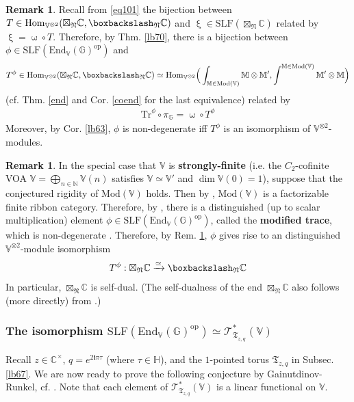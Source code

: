 \documentclass[11pt,b5paper,notitlepage]{article}
\theoremstyle{definition}
\newtheorem{rem}[df]{Remark}
\theoremstyle{plain}
\newcommand{\Tr}{\mathrm{Tr}}
\newcommand{\End}{\mathrm{End}} %
\newcommand{\Hom}{\mathrm{Hom}}
\newcommand{\opp}{\mathrm{op}}
\newcommand{\im}{\mathbf{i}}
\newcommand{\SLF}{\mathrm{SLF}}
\newcommand{\mbb}{\mathbb}
\newcommand{\Vbb}{\mathbb V}
\newcommand{\Mbb}{\mathbb M}
\newcommand{\Gbb}{\mathbb G}
\newcommand{\Cbb}{\mathbb C}
\newcommand{\Nbb}{\mathbb N}
\newcommand{\<}{\left\langle}
\renewcommand{\>}{\right\rangle}
\newcommand{\ST}{\mathscr{T}}
\newcommand{\bbs}{\boxbackslash}
\newcommand{\ft}{{\mathfrak T}}
\newcommand{\Mod}{\mathrm{Mod}}
\newcommand{\fn}{\mathfrak{N}}
\numberwithin{equation}{section}
\begin{document}
\begin{rem}\label{lb73}
Recall from \eqref{eq101} the bijection between $T\in\Hom_{\Vbb^{\otimes 2}}(\boxtimes_\fn\Cbb,\bbs_\fn\Cbb)$ and $\upxi\in\SLF(\boxtimes_\fn\Cbb)$ related by $\upxi=\upomega\circ T$. Therefore, by Thm. \ref{lb70}, there is a bijection between  $\phi\in\SLF(\End_\Vbb(\Gbb)^\opp)$ and
\begin{align*}
T^\phi\in\Hom_{\Vbb^{\otimes2}}(\boxtimes_\fn\Cbb,\bbs_\fn\Cbb)\simeq \Hom_{\Vbb^{\otimes2}}\Big(\int_{\Mbb\in\Mod(\Vbb)}\Mbb\otimes\Mbb',\int^{\Mbb\in\Mod(\Vbb)}\Mbb'\otimes\Mbb\Big)
\end{align*}
(cf. Thm. \ref{end} and Cor. \ref{coend} for the last equivalence) related by
\begin{align}
\Tr^\phi\circ\pi_\Gbb=\upomega\circ T^\phi
\end{align}
Moreover, by Cor. \ref{lb63}, $\phi$ is non-degenerate iff $T^\phi$ is an isomorphism of $\Vbb^{\otimes 2}$-modules.
\end{rem}

\begin{rem}\label{lb74}
In the special case that $\Vbb$ is \textbf{strongly-finite} (i.e. the $C_2$-cofinite VOA $\Vbb=\bigoplus_{n\in\Nbb}\Vbb(n)$ satisfies $\Vbb\simeq\Vbb'$ and $\dim\Vbb(0)=1$), suppose that the conjectured rigidity of $\Mod(\Vbb)$ holds. Then by \cite{McR21-rational}, $\Mod(\Vbb)$ is a factorizable finite ribbon category. Therefore, by \cite{GR-modified-trace}, there is a distinguished (up to scalar multiplication) element $\phi\in\SLF(\End_\Vbb(\Gbb)^\opp)$, called the \textbf{modified trace}, which is non-degenerate \cite[Prop. 4.2]{GR-modified-trace}. Therefore, by Rem. \ref{lb73}, $\phi$ gives rise to an distinguished $\Vbb^{\otimes 2}$-module isomorphism
\begin{align*}
T^\phi:\boxtimes_\fn\Cbb\xrightarrow{\simeq}\bbs_\fn\Cbb
\end{align*}
In particular, $\boxtimes_\fn\Cbb$ is self-dual. (The self-dualness of the end $\boxtimes_\fn\Cbb$ also follows (more directly) from \cite{Shi-unimodular}.)
\end{rem}




\subsubsection{The isomorphism $\SLF(\End_\Vbb(\Gbb)^\opp)\simeq\ST^*_{\ft_{z,q}}(\Vbb)$}


Recall $z\in\Cbb^\times$, $q=e^{2\im\pi\tau}$ (where $\tau\in\mbb H$), and the $1$-pointed torus $\ft_{z,q}$ in Subsec. \ref{lb67}. We are now ready to prove the following conjecture by Gainutdinov-Runkel, cf. \cite[Conjecture 5.8]{GR-Verlinde}. Note that each element of $\ST^*_{\ft_{z,q}}(\Vbb)$ is a linear functional on $\Vbb$.
\end{document}
